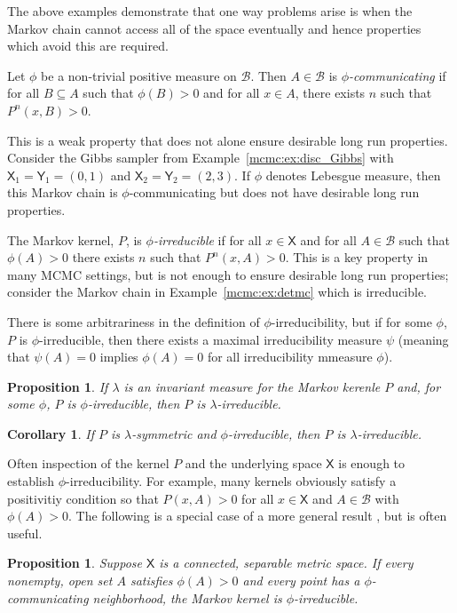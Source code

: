 \documentclass[12pt]{article}
\theoremstyle{plain}
\newtheorem{prop}[thm]{Proposition}
\newtheorem{cor}{Corollary}[section]
\theoremstyle{definition}
\theoremstyle{remark}
\newcommand{\X}{\mathsf{X}}
\newcommand{\Y}{\mathsf{Y}}
\newcommand{\B}{\mathcal{B}}
\begin{document}
The above examples demonstrate that one way problems arise is when the
Markov chain cannot access all of the space eventually and hence
properties which avoid this are required.

Let $\phi$ be a non-trivial positive measure on $\B$.  Then $A \in
\B$ is {\em $\phi$-communicating} if for all $B \subseteq A$ such that
$\phi(B) > 0$ and for all $x \in A$, there exists $n$ such that
$P^n(x,B) >0$.

This is a weak property that does not alone ensure desirable long run
properties.  Consider the Gibbs sampler from
Example~\ref{mcmc:ex:disc_Gibbs} with $\X_1 = \Y_1 = (0,1)$ and
$\X_2 = \Y_2 = (2,3)$. If $\phi$ denotes Lebesgue measure, then this
Markov chain is $\phi$-communicating but does not have desirable long
run properties.

The Markov kernel, $P$,  is {\em $\phi$-irreducible} if for all $x \in \X$ and
for all $A \in \B$ such that $\phi(A) > 0$ there exists $n$ such that
$P^n (x, A) > 0$.  This is a key property in many MCMC settings, but
is not enough to ensure desirable long run properties; consider the
Markov chain in Example~\ref{mcmc:ex:detmc} which is irreducible.

There is some arbitrariness in the definition of
$\phi$-irreducibility, but if for some $\phi$, $P$ is
$\phi$-irreducible, then there exists a maximal irreducibility
measure $\psi$ (meaning that $\psi(A) = 0$ implies $\phi(A)=0$ for all
irreducibility mmeasure $\phi$).

\begin{prop}
  \label{mcmc:prop:inv_irreducible}
  If $\lambda$ is an invariant measure for the Markov kerenle $P$ and,
  for some $\phi$, $P$ is $\phi$-irreducible, then $P$ is
  $\lambda$-irreducible. 
\end{prop}

\begin{cor}
  If $P$ is $\lambda$-symmetric and $\phi$-irreducible, then $P$ is
  $\lambda$-irreducible.  
 \end{cor}

Often inspection of the kernel $P$ and the underlying space $\X$
is enough to establish $\phi$-irreducibility.  For example, many kernels
obviously satisfy a positivitiy condition so that $P(x, A) > 0$ for
all $x \in \X$ and $A \in \B$ with $\phi(A) > 0$. The following is a
special case of a more general result \cite[][Theorem 3]{geye:2014},
but is often useful.

\begin{prop}
  \label{mcmc:prop:irred}
Suppose $\X$ is a connected, separable metric space.  If every
nonempty, open set $A$ satisfies $\phi(A)>0$ and every point has a
$\phi$-communicating neighborhood, the Markov kernel is
$\phi$-irreducible.  
\end{prop}
\end{document}
